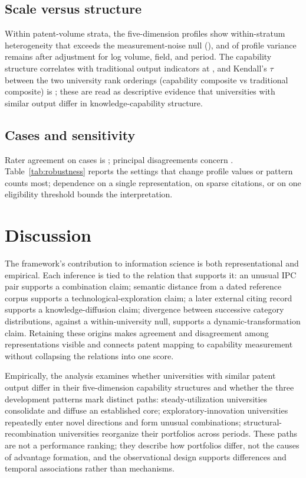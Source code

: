 \subsection{Scale versus structure}
Within patent-volume strata, the five-dimension profiles show within-stratum
heterogeneity that exceeds the measurement-noise null
(), and  of profile variance remains
after adjustment for log volume, field, and period. The capability structure
correlates with traditional output indicators at , and Kendall's $\tau$ between the two university rank orderings
(capability composite vs traditional composite) is \pending{$\tau$}; these are
read as descriptive evidence that universities with similar output differ in
knowledge-capability structure.

\subsection{Cases and sensitivity}
Rater agreement on  cases is ;
principal disagreements concern . Table~\ref{tab:robustness}
reports the settings that change profile values or pattern counts most;
dependence on a single representation, on sparse citations, or on one
eligibility threshold bounds the interpretation.

\FloatBarrier

\section{Discussion}\label{sec:discussion}
The framework's contribution to information science is both representational
and empirical. Each inference is tied to the relation that supports it: an
unusual IPC pair supports a combination claim; semantic distance from a dated
reference corpus supports a technological-exploration claim; a later external
citing record supports a knowledge-diffusion claim; divergence between
successive category distributions, against a within-university null, supports
a dynamic-transformation claim. Retaining these origins makes agreement and
disagreement among representations visible and connects patent mapping
\citep{kay2014,leydesdorff2014,yan2017} to capability measurement without
collapsing the relations into one score.

Empirically, the analysis examines whether universities with similar patent
output differ in their five-dimension capability structures and whether the
three development patterns mark distinct paths: steady-utilization
universities consolidate and diffuse an established core;
exploratory-innovation universities repeatedly enter novel directions and
form unusual combinations; structural-recombination universities reorganize
their portfolios across periods. These paths are not a performance ranking;
they describe how portfolios differ, not the causes of advantage formation,
and the observational design supports differences and temporal associations
rather than mechanisms.

